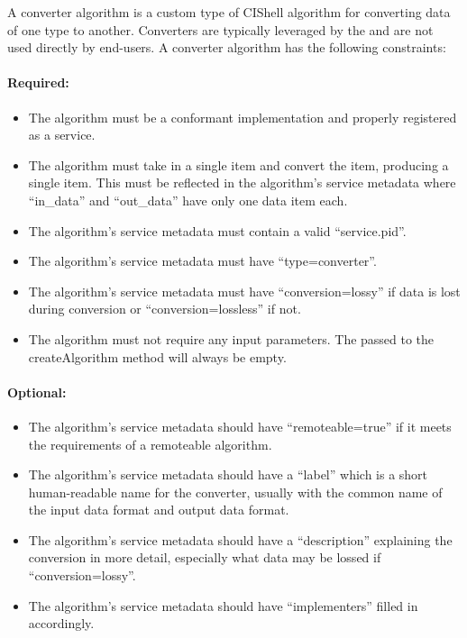 A converter algorithm is a custom type of CIShell algorithm for converting data
of one type to another. Converters are typically leveraged by the
 and are not used directly by end-users. A converter
algorithm has the following constraints:

\paragraph*{Required:}
\begin{itemize}
  \item The algorithm must be a conformant 
  implementation and properly registered as a service.
  \item The algorithm must take in a single  item and convert the
  item, producing a single  item. This must be reflected in the
  algorithm's service metadata where ``in\_data'' and ``out\_data'' have only
  one data item each.
  \item The algorithm's service metadata must contain a valid ``service.pid''.
  \item The algorithm's service metadata must have ``type=converter''.
  \item The algorithm's service metadata must have ``conversion=lossy'' if
  data is lost during conversion or ``conversion=lossless'' if not.
  \item The algorithm must not require any input parameters. The
   passed to the createAlgorithm method will always be empty.
\end{itemize}

\paragraph*{Optional:}
\begin{itemize}
  \item The algorithm's service metadata should have ``remoteable=true'' if it
  meets the requirements of a remoteable algorithm.
  \item The algorithm's service metadata should have a ``label'' which is a
  short human-readable name for the converter, usually with the common name of
  the input data format and output data format.
  \item The algorithm's service metadata should have a ``description''
  explaining the conversion in more detail, especially what data may be lossed
  if ``conversion=lossy''.
  \item The algorithm's service metadata should have ``implementers'' filled
  in accordingly.  
\end{itemize}

